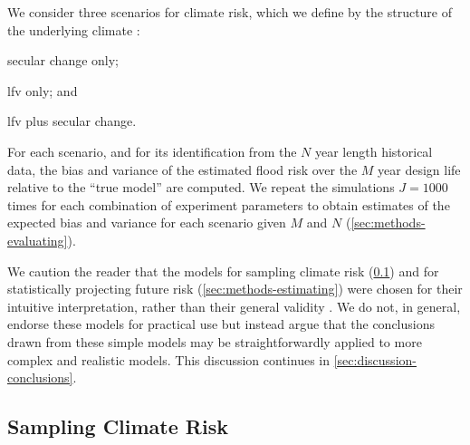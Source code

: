 \documentclass[
  draft,
  linenumbers
]{agujournal2019}
\begin{document}
We consider three scenarios for climate risk, which we define by the structure of the underlying climate :
\begin{enumerate*}[label= (\roman*)]
  \item secular change only;
  \item \gls{lfv} only; and
  \item \gls{lfv} plus secular change.
\end{enumerate*}
For each scenario, and for its identification from the $N$ year length historical data, the bias and variance of the estimated flood risk over the $M$ year design life relative to the ``true model'' are computed.
We repeat the simulations $J = 1000$ times for each combination of experiment parameters to obtain estimates of the expected bias and variance for each scenario given $M$ and $N$ (\cref{sec:methods-evaluating}).

We caution the reader that the models for sampling climate risk (\cref{sec:methods-generating}) and for statistically projecting future risk (\cref{sec:methods-estimating}) were chosen for their intuitive interpretation, rather than their general validity \citep[see][for a thoughtful discussion of the value of simple models]{Held:2005cj}.
We do not, in general, endorse these models for practical use but instead argue that the conclusions drawn from these simple models may be straightforwardly applied to more complex and realistic models.
This discussion continues in \cref{sec:discussion-conclusions}.

\subsection{Sampling Climate Risk}\label{sec:methods-generating}
\end{document}
